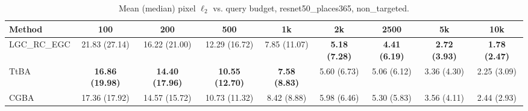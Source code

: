 \begin{table}[t]
\centering\footnotesize
\caption{Mean (median) pixel $\ell_2$ vs. query budget, resnet50\_places365, non\_targeted.}
\begin{tabular}{lcccccccc}
\toprule
Method & 100 & 200 & 500 & 1k & 2k & 2500 & 5k & 10k \\
\midrule
LGC\_RC\_EGC & 21.83 (27.14) & 16.22 (21.00) & 12.29 (16.72) & 7.85 (11.07) & \textbf{5.18 (7.28)} & \textbf{4.41 (6.19)} & \textbf{2.72 (3.93)} & \textbf{1.78 (2.47)} \\
TtBA & \textbf{16.86 (19.98)} & \textbf{14.40 (17.96)} & \textbf{10.55 (12.70)} & \textbf{7.58 (8.83)} & 5.60 (6.73) & 5.06 (6.12) & 3.36 (4.30) & 2.25 (3.09) \\
CGBA & 17.36 (17.92) & 14.57 (15.72) & 10.73 (11.32) & 8.42 (8.88) & 5.98 (6.46) & 5.30 (5.83) & 3.56 (4.11) & 2.44 (2.93) \\
\bottomrule
\end{tabular}
\end{table}
